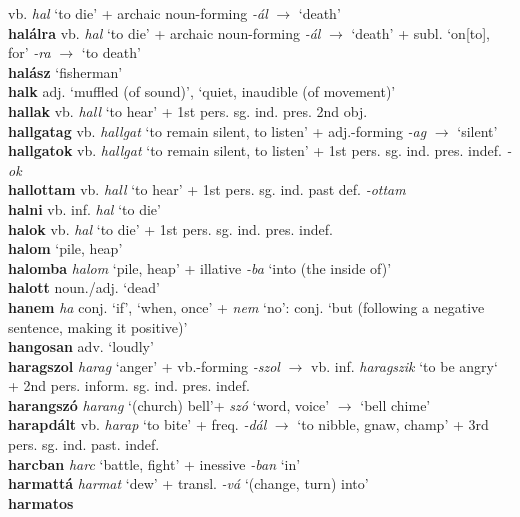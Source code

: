 \documentclass[11pt]{article}
\begin{document}
vb. \emph{hal} `to die' + archaic noun\hyp{}forming \emph{-ál}
$\rightarrow$ `death' \\ \textbf{halálra} vb. \emph{hal} `to die' +
archaic noun\hyp{}forming \emph{-ál} $\rightarrow$ `death' +
subl. `on[to], for' \emph{-ra} $\rightarrow$ `to death'
\\ \textbf{halász} `fisherman'\\ \textbf{halk} adj. `muffled (of
sound)', `quiet, inaudible (of movement)' \\ \textbf{hallak}
vb. \emph{hall} `to hear' + 1st pers. sg. ind. pres. 2nd
obj. \\ \textbf{hallgatag} vb. \emph{hallgat} `to remain silent, to
listen' + adj.\hyp{}forming \emph{-ag} $\rightarrow$ `silent'
\\ \textbf{hallgatok} vb. \emph{hallgat} `to remain silent, to listen'
+ 1st pers. sg. ind. pres. indef. \emph{-ok} \\ \textbf{hallottam}
vb. \emph{hall} `to hear' + 1st pers. sg. ind. past def. \emph{-ottam}
\\ \textbf{halni} vb. inf. \emph{hal} `to die' \\ \textbf{halok}
vb. \emph{hal} `to die' + 1st
pers. sg. ind. pres. indef. \\ \textbf{halom} `pile, heap'
\\ \textbf{halomba} \emph{halom} `pile, heap' + illative \emph{-ba}
`into (the inside of)' \\ \textbf{halott} noun./adj. `dead'
\\ \textbf{hanem} \emph{ha} conj. `if', `when, once' + \emph{nem}
`no': conj. `but (following a negative sentence, making it positive)'
\\ \textbf{hangosan} adv. `loudly' \\ \textbf{haragszol} \emph{harag}
`anger' + vb.-forming \emph{-szol} $\rightarrow$
vb. inf. \emph{haragszik} `to be angry` + 2nd
pers. inform. sg. ind. pres. indef. \\ \textbf{harangszó}
\emph{harang} `(church) bell'+ \emph{szó} `word, voice' $\rightarrow$
`bell chime' \\ \textbf{harapdált} vb. \emph{harap} `to bite' +
freq. \emph{-dál} $\rightarrow$ `to nibble, gnaw, champ' + 3rd
pers. sg. ind. past. indef. \\ \textbf{harcban} \emph{harc} `battle,
fight' + inessive \emph{-ban} `in' \\ \textbf{harmattá} \emph{harmat}
`dew' + transl. \emph{-vá} `(change, turn) into' \\ \textbf{harmatos}
\end{document}
